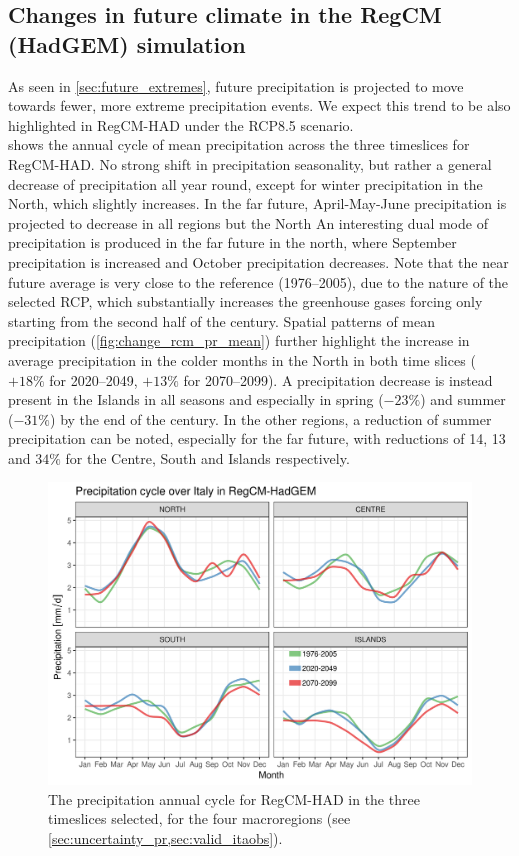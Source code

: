 \subsection{Changes in future climate in the RegCM (HadGEM) simulation}\label{sec:change_rcm}
As seen in \cref{sec:future_extremes}, future precipitation is projected to move towards fewer, more extreme precipitation events. We expect this trend to be also highlighted in RegCM-HAD under the RCP8.5 scenario.\\
 shows the annual cycle of mean precipitation across the three timeslices for RegCM-HAD.
No strong shift in precipitation seasonality, but rather a general decrease of precipitation all year round, except for winter precipitation in the North, which slightly increases.
In the far future, April-May-June precipitation is projected to decrease in all regions but the North
An interesting dual mode of precipitation is produced in the far future in the north, where September precipitation is increased and October precipitation decreases.
Note that the near future average is very close to the reference (1976--2005), due to the nature of the selected RCP, which substantially increases the greenhouse gases forcing only starting from the second half of the century.
Spatial patterns of mean precipitation (\cref{fig:change_rcm_pr_mean}) further highlight the increase in average precipitation in the colder months in the North in both time slices ($+18\%$ for 2020--2049, $+13\%$ for 2070--2099).
A precipitation decrease is instead present in the Islands in all seasons and especially in spring ($-23\%$) and summer ($-31\%$) by the end of the century.
In the other regions, a reduction of summer precipitation can be noted, especially for the far future, with reductions of 14, 13 and $34\%$ for the Centre, South and Islands respectively.
\begin{figure}
    \centering
    \includegraphics[width=\textwidth]{figures/change_rcm/pr/ac}
    \decoRule
    \caption[Projected change change of the precipitation annual cycle]{
        The precipitation annual cycle for RegCM-HAD in the three timeslices selected, for the four macroregions (see \cref{sec:uncertainty_pr,sec:valid_itaobs}).
    }\label{fig:change_rcm_pr_ac}
\end{figure}
